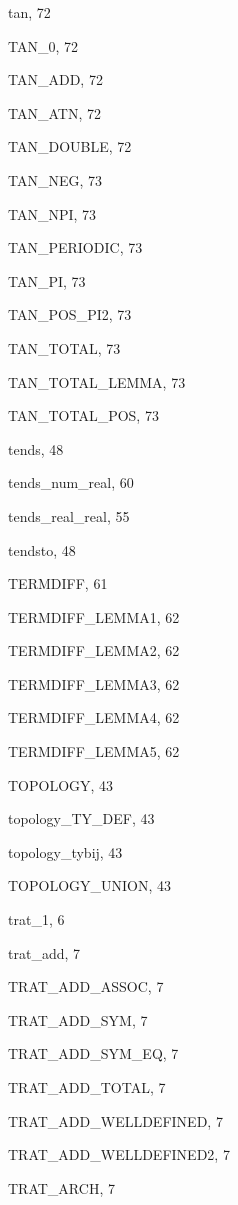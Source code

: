 \begin{theindex}
  \item {\ptt tan}, 72
  \item {\ptt TAN\_0}, 72
  \item {\ptt TAN\_ADD}, 72
  \item {\ptt TAN\_ATN}, 72
  \item {\ptt TAN\_DOUBLE}, 72
  \item {\ptt TAN\_NEG}, 73
  \item {\ptt TAN\_NPI}, 73
  \item {\ptt TAN\_PERIODIC}, 73
  \item {\ptt TAN\_PI}, 73
  \item {\ptt TAN\_POS\_PI2}, 73
  \item {\ptt TAN\_TOTAL}, 73
  \item {\ptt TAN\_TOTAL\_LEMMA}, 73
  \item {\ptt TAN\_TOTAL\_POS}, 73
  \item {\ptt tends}, 48
  \item {\ptt tends\_num\_real}, 60
  \item {\ptt tends\_real\_real}, 55
  \item {\ptt tendsto}, 48
  \item {\ptt TERMDIFF}, 61
  \item {\ptt TERMDIFF\_LEMMA1}, 62
  \item {\ptt TERMDIFF\_LEMMA2}, 62
  \item {\ptt TERMDIFF\_LEMMA3}, 62
  \item {\ptt TERMDIFF\_LEMMA4}, 62
  \item {\ptt TERMDIFF\_LEMMA5}, 62
  \item {\ptt TOPOLOGY}, 43
  \item {\ptt topology\_TY\_DEF}, 43
  \item {\ptt topology\_tybij}, 43
  \item {\ptt TOPOLOGY\_UNION}, 43
  \item {\ptt trat\_1}, 6
  \item {\ptt trat\_add}, 7
  \item {\ptt TRAT\_ADD\_ASSOC}, 7
  \item {\ptt TRAT\_ADD\_SYM}, 7
  \item {\ptt TRAT\_ADD\_SYM\_EQ}, 7
  \item {\ptt TRAT\_ADD\_TOTAL}, 7
  \item {\ptt TRAT\_ADD\_WELLDEFINED}, 7
  \item {\ptt TRAT\_ADD\_WELLDEFINED2}, 7
  \item {\ptt TRAT\_ARCH}, 7

\end{theindex}
